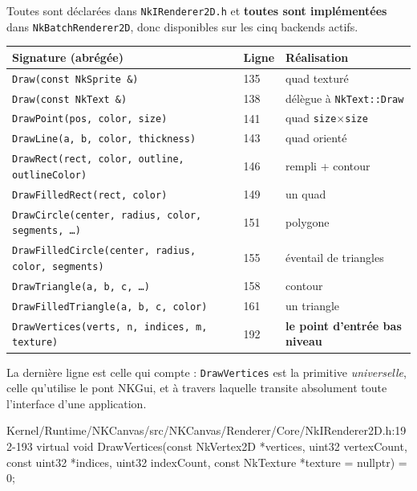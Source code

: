 Toutes sont déclarées dans \texttt{NkIRenderer2D.h} et \textbf{toutes sont
implémentées} dans \texttt{NkBatchRenderer2D}, donc disponibles sur les cinq
backends actifs.

\begin{center}
\begin{tabular}{@{}p{}ll@{}}
\toprule
\textbf{Signature (abrégée)} & \textbf{Ligne} & \textbf{Réalisation} \\
\midrule
\texttt{Draw(const NkSprite \&)}                       & 135 & quad texturé \\
\texttt{Draw(const NkText \&)}                         & 138 & délègue à \texttt{NkText::Draw} \\
\texttt{DrawPoint(pos, color, size)}                   & 141 & quad \texttt{size}$\times$\texttt{size} \\
\texttt{DrawLine(a, b, color, thickness)}              & 143 & quad orienté \\
\texttt{DrawRect(rect, color, outline, outlineColor)}  & 146 & rempli + contour \\
\texttt{DrawFilledRect(rect, color)}                   & 149 & un quad \\
\texttt{DrawCircle(center, radius, color, segments, \dots)} & 151 & polygone \\
\texttt{DrawFilledCircle(center, radius, color, segments)}  & 155 & éventail de triangles \\
\texttt{DrawTriangle(a, b, c, \dots)}                  & 158 & contour \\
\texttt{DrawFilledTriangle(a, b, c, color)}            & 161 & un triangle \\
\texttt{DrawVertices(verts, n, indices, m, texture)}   & 192 & \textbf{le point d'entrée bas niveau} \\
\bottomrule
\end{tabular}
\end{center}

La dernière ligne est celle qui compte : \texttt{DrawVertices} est la primitive
\emph{universelle}, celle qu'utilise le pont NKGui, et à travers laquelle
transite absolument toute l'interface d'une application.

\begin{nkcode}{Kernel/Runtime/NKCanvas/src/NKCanvas/Renderer/Core/NkIRenderer2D.h:192-193}
virtual void DrawVertices(const NkVertex2D *vertices, uint32 vertexCount,
                          const uint32 *indices, uint32 indexCount,
                          const NkTexture *texture = nullptr) = 0;
\end{nkcode}

